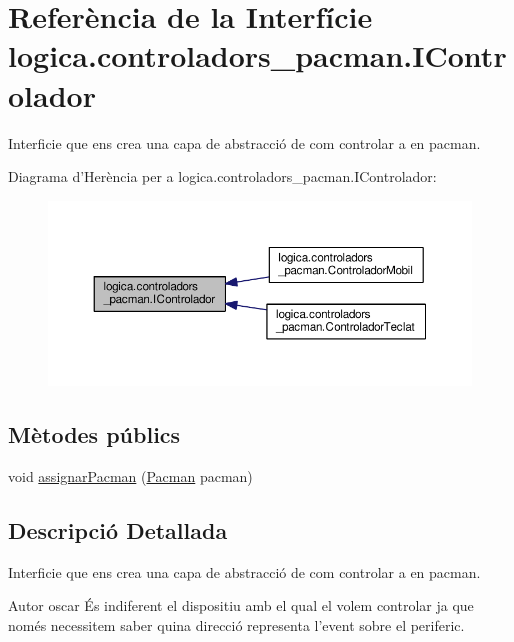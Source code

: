 \hypertarget{interfacelogica_1_1controladors__pacman_1_1_i_controlador}{\section{Referència de la Interfície logica.\+controladors\+\_\+pacman.\+I\+Controlador}
\label{interfacelogica_1_1controladors__pacman_1_1_i_controlador}
}


Interficie que ens crea una capa de abstracció de com controlar a en pacman.  




Diagrama d'Herència per a logica.\+controladors\+\_\+pacman.\+I\+Controlador\+:
\nopagebreak
\begin{figure}[H]
\begin{center}
\leavevmode
\includegraphics[width=350pt]{interfacelogica_1_1controladors__pacman_1_1_i_controlador__inherit__graph}
\end{center}
\end{figure}
\subsection*{Mètodes públics}
\begin{DoxyCompactItemize}
\item 
void \hyperlink{interfacelogica_1_1controladors__pacman_1_1_i_controlador_ac765182730a4337c576a9764cdd521fa}{assignar\+Pacman} (\hyperlink{classlogica_1_1_pacman}{Pacman} pacman)
\end{DoxyCompactItemize}


\subsection{Descripció Detallada}
Interficie que ens crea una capa de abstracció de com controlar a en pacman. 

\begin{DoxyAuthor}{Autor}
oscar És indiferent el dispositiu amb el qual el volem controlar ja que només necessitem saber quina direcció representa l'event sobre el periferic. 
\end{DoxyAuthor}


